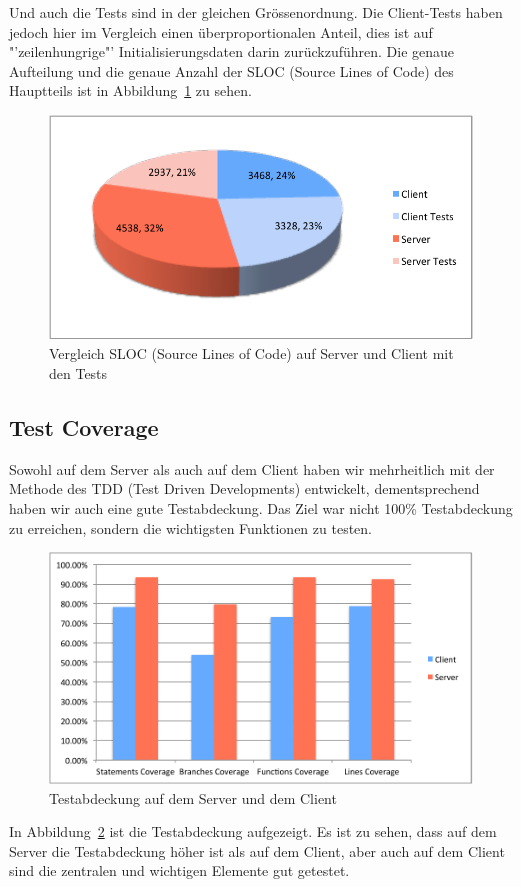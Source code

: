 	Und auch die Tests sind in der gleichen Grössenordnung.
	Die Client-Tests haben jedoch hier im Vergleich einen überproportionalen Anteil,
	dies ist auf "'zeilenhungrige"' Initialisierungsdaten darin zurückzuführen.
	Die genaue Aufteilung und die genaue Anzahl der SLOC (Source Lines of Code) des Hauptteils ist in Abbildung\ \ref{fig:serverClientSLOC} zu sehen.
	\begin{figure}[H]
		\includegraphics[width=\largeThird\textwidth]{qualityManagement/media/img/serverClientSLOC.pdf}
		\centering
		\caption{Vergleich SLOC (Source Lines of Code) auf Server und Client mit den Tests}
		\label{fig:serverClientSLOC}
	\end{figure}

	\subsection{Test Coverage}
	Sowohl auf dem Server als auch auf dem Client haben wir mehrheitlich mit der Methode des TDD (Test Driven Developments) entwickelt,
	dementsprechend haben wir auch eine gute Testabdeckung.
	Das Ziel war nicht 100\% Testabdeckung zu erreichen, sondern die wichtigsten Funktionen zu testen.
	\begin{figure}[H]
		\includegraphics[width=\textwidth]{qualityManagement/media/img/coverage.pdf}
		\centering
		\caption{Testabdeckung auf dem Server und dem Client}
		\label{fig:coverage}
	\end{figure}
	In Abbildung\ \ref{fig:coverage} ist die Testabdeckung aufgezeigt.
	Es ist zu sehen, dass auf dem Server die Testabdeckung höher ist als auf dem Client,
	aber auch auf dem Client sind die zentralen und wichtigen Elemente gut getestet.
	
